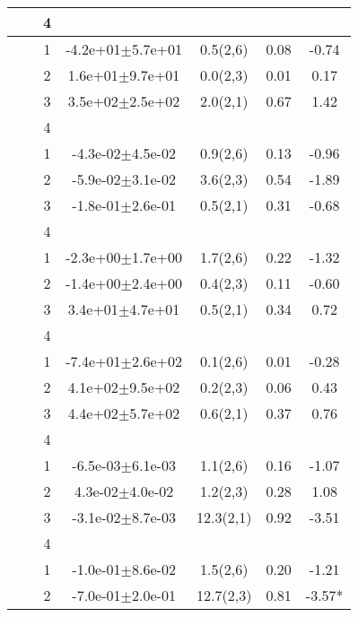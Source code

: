 \begin{longtable}[H]{llccccS[table-format=-2.2, table-space-text-post = {***}]}
   &  & 4 &  &  &  &  \\ 
   \midrule
{} & {} & 1 & -4.2e+01$\pm$5.7e+01 & 0.5(2,6) & 0.08 & -0.74 \\* 
   &  & 2 &  1.6e+01$\pm$9.7e+01 & 0.0(2,3) & 0.01 & 0.17 \\* 
   &  & 3 &  3.5e+02$\pm$2.5e+02 & 2.0(2,1) & 0.67 & 1.42 \\* 
   &  & 4 &  &  &  &  \\ 
   \midrule
{} & {} & 1 & -4.3e-02$\pm$4.5e-02 & 0.9(2,6) & 0.13 & -0.96 \\* 
   &  & 2 & -5.9e-02$\pm$3.1e-02 & 3.6(2,3) & 0.54 & -1.89 \\* 
   &  & 3 & -1.8e-01$\pm$2.6e-01 & 0.5(2,1) & 0.31 & -0.68 \\* 
   &  & 4 &  &  &  &  \\ 
   \midrule
{} & {} & 1 & -2.3e+00$\pm$1.7e+00 & 1.7(2,6) & 0.22 & -1.32 \\* 
   &  & 2 & -1.4e+00$\pm$2.4e+00 & 0.4(2,3) & 0.11 & -0.60 \\* 
   &  & 3 &  3.4e+01$\pm$4.7e+01 & 0.5(2,1) & 0.34 & 0.72 \\* 
   &  & 4 &  &  &  &  \\ 
   \midrule
{} & {} & 1 & -7.4e+01$\pm$2.6e+02 & 0.1(2,6) & 0.01 & -0.28 \\* 
   &  & 2 &  4.1e+02$\pm$9.5e+02 & 0.2(2,3) & 0.06 & 0.43 \\* 
   &  & 3 &  4.4e+02$\pm$5.7e+02 & 0.6(2,1) & 0.37 & 0.76 \\* 
   &  & 4 &  &  &  &  \\ 
   \midrule
{} & {} & 1 & -6.5e-03$\pm$6.1e-03 & 1.1(2,6) & 0.16 & -1.07 \\* 
   &  & 2 &  4.3e-02$\pm$4.0e-02 & 1.2(2,3) & 0.28 & 1.08 \\* 
   &  & 3 & -3.1e-02$\pm$8.7e-03 & 12.3(2,1) & 0.92 & -3.51 \\* 
   &  & 4 &  &  &  &  \\ 
   \midrule
{} & {} & 1 & -1.0e-01$\pm$8.6e-02 & 1.5(2,6) & 0.20 & -1.21 \\* 
   &  & 2 & -7.0e-01$\pm$2.0e-01 & 12.7(2,3) & 0.81 & -3.57* \\* 

\end{longtable}

